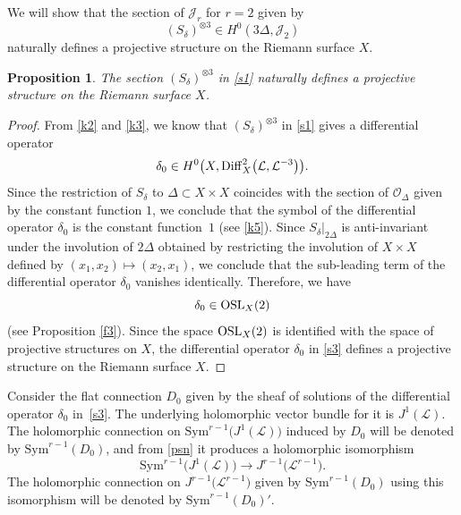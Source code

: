 \documentclass[10pt,a4paper]{amsart}
\numberwithin{equation}{section}
\newtheorem{Proposition}[Theorem]{Proposition}
 { \theoremstyle{definition}
\newtheorem{Definition}[Theorem]{Definition}
\newtheorem{Note}[Theorem]{Note}
\newtheorem{Example}[Theorem]{Example}
\newtheorem{Remark}[Theorem]{Remark} }
\begin{document}
We will show that the section of $\mathcal{J}_r$ for $r = 2$ given by
\begin{equation}\label{s1}
(S_\delta)^{\otimes 3} \in H^0(3\Delta, \mathcal{J}_2)
\end{equation}
naturally defines a projective structure on the Riemann surface $X$.

\begin{Proposition}
The section $(S_\delta)^{\otimes 3}$ in \eqref{s1} naturally defines a projective structure on
the Riemann surface $X$.
\end{Proposition}

\begin{proof}From \eqref{k2} and \eqref{k3}, we know that $(S_\delta)^{\otimes 3}$ in \eqref{s1} gives a differential operator
\begin{equation}\label{s3}
\delta_0 \in H^0\bigl(X, {\rm Diff}^2_X\bigl({\mathcal L}, {\mathcal L}^{-3}\bigr)\bigr).
\end{equation}
Since the restriction of $S_\delta$ to $\Delta \subset X\times X$ coincides with the section of
${\mathcal O}_\Delta$ given by the constant function $1$, we conclude that the symbol of the differential
operator $\delta_0$ is the constant function~$1$ (see \eqref{k5}). Since
$S_\delta\big\vert_{2\Delta}$ is anti-invariant under the involution of $2\Delta$ obtained by restricting
the involution of $X\times X$ defined by $(x_1, x_2) \longmapsto (x_2, x_1)$, we conclude that
the sub-leading term of the differential operator $\delta_0$ vanishes identically.
Therefore, we have
\[
\delta_0 \in {\rm OSL}_X(2)
\]
(see Proposition \ref{f3}). Since the space ${\rm OSL}_X(2)$ is identified with the space of projective structures on $X$,
the differential operator $\delta_0$ in \eqref{s3} defines a projective structure on
the Riemann surface $X$.
\end{proof}

Consider the flat connection $D_0$ given by the sheaf of solutions of the differential operator $\delta_0$ in~\eqref{s3}.
The underlying holomorphic vector bundle for it is $J^1(\mathcal L)$.
The holomorphic connection on $\text{Sym}^{r-1}\bigl(J^1(\mathcal L)\bigr)$ induced by $D_0$ will be denoted by
$\text{Sym}^{r-1}(D_0)$, and from \eqref{psn} it produces a holomorphic isomorphism
\[\text{Sym}^{r-1}\bigl(J^1(\mathcal L)\bigr) \longrightarrow J^{r-1}\bigl({\mathcal L}^{r-1}\bigr).
\]
The holomorphic connection on $J^{r-1}\bigl({\mathcal L}^{r-1}\bigr)$
given by $\text{Sym}^{r-1}(D_0)$ using this isomorphism will be denoted by $\text{Sym}^{r-1}(D_0)'$.
\end{document}
